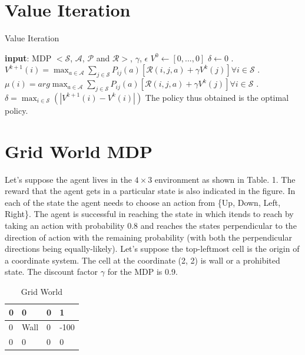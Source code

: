 \documentclass{article}
\begin{document}
\section{Value Iteration}
\begin{algorithm}[H]
    \caption{Value Iteration}\label{value_iteration}
    \begin{algorithmic}
        \State \textbf{input}: MDP $<\mathcal{S}$, $\mathcal{A}$, $\mathcal{P}$ and $\mathcal{R}>$, $\gamma$, $\epsilon$
        \State $V^{0} \gets [0,..., 0]$
        \State $\delta \gets 0$
        \While{$\delta >= \epsilon$}
            . $V^{k+1}(i) = \max_{a \in \mathcal{A}}\sum_{j \in \mathcal{S}} P_{ij}(a) [\mathcal{R}(i, j, a) + \gamma V^{k}(j)] \forall i \in \mathcal{S}$
            . $\mu(i) = arg \max_{a \in \mathcal{A}}\sum_{j \in \mathcal{S}} P_{ij}(a) [\mathcal{R}(i, j, a) + \gamma V^{k}(j)] \forall i \in \mathcal{S}$
            . $\delta = \max_{i \in \mathcal{S}}(|V^{k+1}(i) - V^{k}(i)|)$
        \EndWhile
        \State The policy thus obtained is the optimal policy.
    \end{algorithmic}
\end{algorithm}

\section{Grid World MDP}
Let's suppose the agent lives in the $4 \times 3$ environment as shown in Table. 1. The reward that the agent gets in a particular
state is also indicated in the figure. In each of the state the agent needs to choose an action from \{Up, Down, Left, Right\}. The
agent is successful in reaching the state in which itends to reach by taking an action with probability 0.8 and reaches the states
perpendicular to the direction of action with the remaining probability (with both the perpendicular directions being equally-likely).
Let's suppose the top-leftmost cell is the origin of a coordinate system. The cell at the coordinate (2, 2) is wall or a prohibited
state. The discount factor $\gamma$ for the MDP is 0.9. 

\begin{table}[H]
    \begin{center}
    \renewcommand{\arraystretch}{2}
    \begin{tabular}{ | m{1cm} | m{1cm}| m{1cm} | m{1cm} | } 
      \hline
      0 & 0 & 0 & \cellcolor{green!25}1 \\ 
      \hline
      0 & \cellcolor{gray!25}Wall & 0 & \cellcolor{red!25}-100 \\ 
      \hline
      0 & 0 & 0 & 0 \\ 
      \hline
    \end{tabular}
    \label{grid_world}
    \caption{Grid World}
    \renewcommand{\arraystretch}{1}
\end{center}
\end{table}
	
\end{document}

